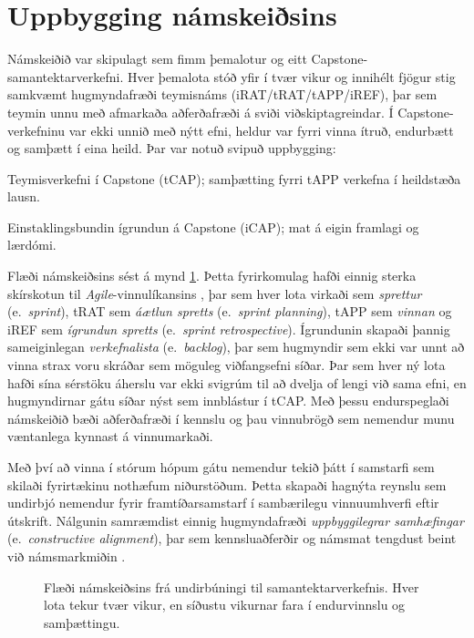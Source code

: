 \documentclass{article}
\begin{document}
\section*{Uppbygging námskeiðsins}
Námskeiðið var skipulagt sem fimm þemalotur og eitt Capstone-samantektarverkefni. Hver þemalota stóð yfir í tvær vikur og innihélt fjögur stig samkvæmt hugmyndafræði teymisnáms (iRAT/tRAT/tAPP/iREF), þar sem teymin unnu með afmarkaða aðferðafræði á sviði viðskiptagreindar.
Í Capstone-verkefninu var ekki unnið með nýtt efni, heldur var fyrri vinna ítruð, endurbætt og samþætt í eina heild. Þar var notuð svipuð uppbygging:
\begin{enumerate*}
    \item Teymisverkefni í Capstone (tCAP); samþætting fyrri tAPP verkefna í heildstæða lausn.
    \item Einstaklingsbundin ígrundun á Capstone (iCAP); mat á eigin framlagi og lærdómi.
\end{enumerate*}

Flæði námskeiðsins sést á mynd \ref{fig:course-flow}. Þetta fyrirkomulag hafði einnig sterka skírskotun til \textit{Agile}-vinnulíkansins \citep{schwaber2002agile}, þar sem hver lota virkaði sem \emph{sprettur} (e.~\textit{sprint}), tRAT sem \emph{áætlun spretts} (e.~\textit{sprint planning}), tAPP sem \emph{vinnan} og iREF sem \emph{ígrundun spretts} (e.~\textit{sprint retrospective}). Ígrundunin skapaði þannig sameiginlegan \textit{verkefnalista} (e.~\emph{backlog}), þar sem hugmyndir sem ekki var unnt að vinna strax voru skráðar sem möguleg viðfangsefni síðar. Þar sem hver ný lota hafði sína sérstöku áherslu var ekki svigrúm til að dvelja of lengi við sama efni, en hugmyndirnar gátu síðar nýst sem innblástur í tCAP. Með þessu endurspeglaði námskeiðið bæði aðferðafræði í kennslu og þau vinnubrögð sem nemendur munu væntanlega kynnast á vinnumarkaði.

Með því að vinna í stórum hópum gátu nemendur tekið þátt í samstarfi sem skilaði fyrirtækinu nothæfum niðurstöðum. Þetta skapaði hagnýta reynslu sem undirbjó nemendur fyrir framtíðarsamstarf í sambærilegu vinnuumhverfi eftir útskrift. Nálgunin samræmdist einnig hugmyndafræði \textit{uppbyggilegrar samhæfingar} (e.~\textit{constructive alignment}), þar sem kennsluaðferðir og námsmat tengdust beint við námsmarkmiðin \citep{biggs_constructive}.

\begin{figure}[ht]
\centering

\caption{Flæði námskeiðsins frá undirbúningi til samantektarverkefnis. Hver lota tekur tvær vikur, en síðustu vikurnar fara í endurvinnslu og samþættingu.}
\label{fig:course-flow}
\end{figure}
\end{document}
